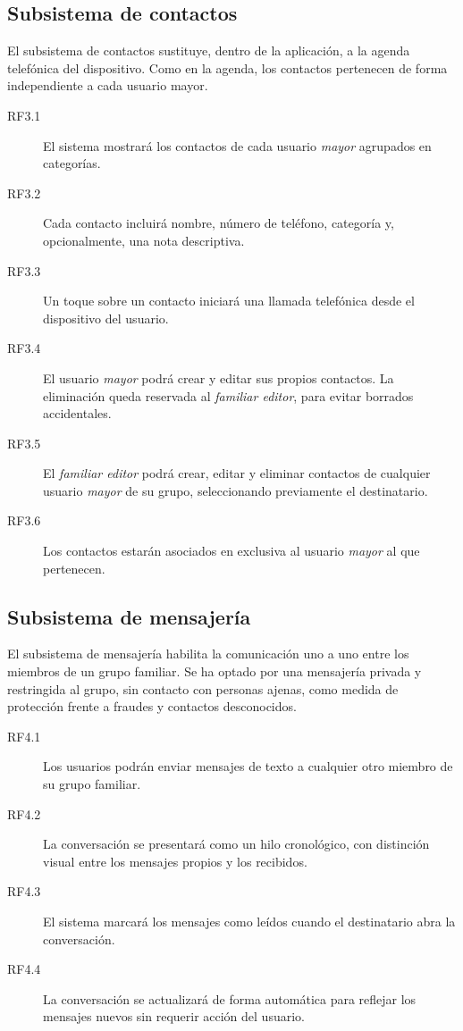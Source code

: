 \subsection{Subsistema de contactos\label{SUB:REQ_CONTACTOS}}

El subsistema de contactos sustituye, dentro de la aplicación, a la agenda
telefónica del dispositivo. Como en la agenda, los contactos pertenecen de
forma independiente a cada usuario mayor.

\begin{description}
  \item[RF3.1] El sistema mostrará los contactos de cada usuario
  \emph{mayor} agrupados en categorías.
  \item[RF3.2] Cada contacto incluirá nombre, número de teléfono, categoría
  y, opcionalmente, una nota descriptiva.
  \item[RF3.3] Un toque sobre un contacto iniciará una llamada telefónica
  desde el dispositivo del usuario.
  \item[RF3.4] El usuario \emph{mayor} podrá crear y editar sus propios
  contactos. La eliminación queda reservada al \emph{familiar editor}, para
  evitar borrados accidentales.
  \item[RF3.5] El \emph{familiar editor} podrá crear, editar y eliminar
  contactos de cualquier usuario \emph{mayor} de su grupo, seleccionando
  previamente el destinatario.
  \item[RF3.6] Los contactos estarán asociados en exclusiva al usuario
  \emph{mayor} al que pertenecen.
\end{description}

\subsection{Subsistema de mensajería\label{SUB:REQ_MENSAJES}}

El subsistema de mensajería habilita la comunicación uno a uno entre los
miembros de un grupo familiar. Se ha optado por una mensajería privada y
restringida al grupo, sin contacto con personas ajenas, como medida de
protección frente a fraudes y contactos desconocidos.

\begin{description}
  \item[RF4.1] Los usuarios podrán enviar mensajes de texto a cualquier
  otro miembro de su grupo familiar.
  \item[RF4.2] La conversación se presentará como un hilo cronológico, con
  distinción visual entre los mensajes propios y los recibidos.
  \item[RF4.3] El sistema marcará los mensajes como leídos cuando el
  destinatario abra la conversación.
  \item[RF4.4] La conversación se actualizará de forma automática para
  reflejar los mensajes nuevos sin requerir acción del usuario.
\end{description}

